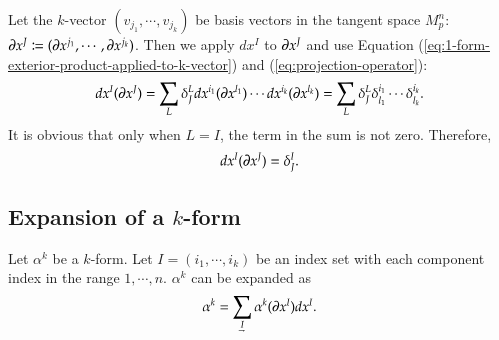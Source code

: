\documentclass[11pt, a4paper]{book}
\begin{document}
\begin{Example}
  
  Let the $k$-vector $\left( v_{j_1},\cdots,v_{j_k} \right)$ be basis vectors in the
  tangent space $M_p^n$:
  $\boldsymbol{\partial}x^J \coloneqq (\boldsymbol{\partial}x^{j_1},\cdots,\boldsymbol{\partial}x^{j_k})$. Then we
  apply $dx^I$ to $\boldsymbol{\partial}x^J$ and use Equation
  (\ref{eq:1-form-exterior-product-applied-to-k-vector}) and
  (\ref{eq:projection-operator}):
  \begin{equation}
    dx^I(\boldsymbol{\partial}x^J) = \sum_{L} \delta_J^L dx^{i_1}(\boldsymbol{\partial}x^{l_1}) \cdots
    dx^{i_k}(\boldsymbol{\partial}x^{l_k}) = \sum_L \delta_J^L \delta_{l_1}^{i_1} \cdots
    \delta_{l_k}^{i_k}.
  \end{equation}
  It is obvious that only when $L=I$, the term in the sum is not zero. Therefore,
  \begin{equation}
    \label{eq:cotangent-basis-appled-to-tangent-basis}
    dx^I(\boldsymbol{\partial}x^J) = \delta_J^I.
  \end{equation}
\end{Example}

\subsection{Expansion of a $k$-form}
\label{sec:expansion-of-k-form}

\begin{Proposition}
  \label{prop:k-form-expansion}
  Let $\alpha^k$ be a $k$-form. Let $I = (i_1,\cdots,i_k)$ be an index set with each
  component index in the range $1,\cdots,n$. $\alpha^k$ can be expanded as
  \begin{equation}
    \alpha^k = \sum_{\underaccent{\rightharpoondown}{I}} \alpha^k(\vect{\pdiff}x^I) dx^I.
  \end{equation}
\end{Proposition}
\end{document}
